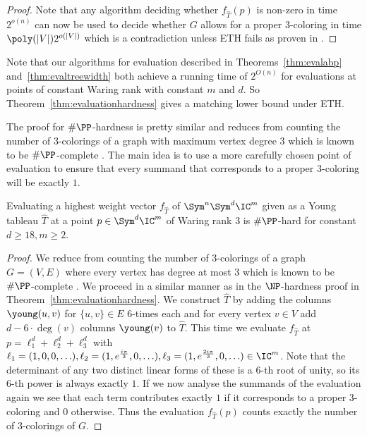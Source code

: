 \begin{proof}
    Note that any algorithm deciding whether $f_{\hat{T}}(p)$ is non-zero in time $2^{o(n)}$ can now be used to decide whether $G$ allows for a proper $3$-coloring in time $\poly(|V|)2^{o(|V|)}$ which is a contradiction unless ETH fails as proven in \cite{DBLP:journals/jcss/ImpagliazzoPZ01}.
\end{proof}

Note that our algorithms for evaluation described in Theorems~\ref{thm:evalabp} and~\ref{thm:evaltreewidth} both achieve a running time of $2^{O(n)}$ for evaluations at points of constant Waring rank with constant $m$ and $d$.
So Theorem~\ref{thm:evaluationhardness} gives a matching lower bound under ETH.

The proof for $\#\PP$-hardness is pretty similar and reduces from counting the number of $3$-colorings of a graph with maximum vertex degree $3$ which is known to be $\#\PP$-complete \cite{DBLP:journals/siamcomp/BubleyDGJ99}.
The main idea is to use a more carefully chosen point of evaluation to ensure that every summand that corresponds to a proper $3$-coloring will be exactly $1$.

\begin{theorem}
    \label{thm:evaluationsharpphardness}
    Evaluating a highest weight vector $f_{\hat{T}}$ of $\Sym^n\Sym^d \IC^m$ given as a Young tableau $\hat{T}$ at a point $p \in \Sym^d \IC^m$ of Waring rank $3$ is $\#\PP$-hard for constant $d \geq 18, m \geq 2$.
\end{theorem}
\begin{proof}
    We reduce from counting the number of $3$-colorings of a graph $G=(V, E)$ where every vertex has degree at most $3$ which is known to be $\#\PP$-complete \cite{DBLP:journals/siamcomp/BubleyDGJ99}.
    We proceed in a similar manner as in the $\NP$-hardness proof in Theorem~\ref{thm:evaluationhardness}.
    We construct $\hat{T}$ by adding the columns {\scriptsize $\young(u,v)$} for $\{u,v\} \in E$ $6$-times each and for every vertex $v \in V$ add $d-6\cdot\deg(v)$ columns {\scriptsize $\young(v)$} to $\hat{T}$.
    This time we evaluate $f_{\hat{T}}$ at $p = \ell_1^d + \ell_2^d + \ell_3^d$ with $\ell_1 = (1, 0, 0, \ldots), \ell_2 = (1, e^{\frac{i\pi}{3}}, 0, \ldots), \ell_3 = (1, e^{\frac{2i\pi}{3}}, 0, \ldots) \in \IC^m$.
    Note that the determinant of any two distinct linear forms of these is a $6$-th root of unity, so its $6$-th power is always exactly $1$.
    If we now analyse the summands of the evaluation again we see that each term contributes exactly $1$ if it corresponds to a proper $3$-coloring and $0$ otherwise.
    Thus the evaluation $f_{\hat{T}}(p)$ counts exactly the number of $3$-colorings of $G$.
\end{proof}

